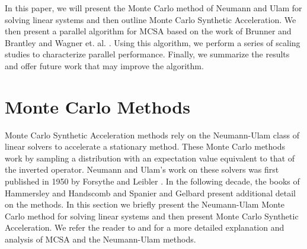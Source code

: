 \documentclass{snamc2013}
\begin{document}
In this paper, we will present the Monte Carlo method of Neumann and
Ulam for solving linear systems and then outline Monte Carlo Synthetic
Acceleration. We then present a parallel algorithm for MCSA based on
the work of Brunner and Brantley \cite{brunner_efficient_2009} and
Wagner et. al. \cite{wagner_hybrid_2010}. Using this algorithm, we
perform a series of scaling studies to characterize parallel
performance. Finally, we summarize the results and offer future work
that may improve the algorithm.

\section{Monte Carlo Methods}
Monte Carlo Synthetic Acceleration methods rely on the Neumann-Ulam
class of linear solvers to accelerate a stationary method. These Monte
Carlo methods work by sampling a distribution with an expectation
value equivalent to that of the inverted operator. Neumann and Ulam's
work on these solvers was first published in 1950 by Forsythe and
Leibler \cite{forsythe_matrix_1950}. In the following decade, the
books of Hammersley and Handscomb \cite{hammersley_monte_1964} and
Spanier and Gelbard \cite{spanier_monte_1969} present additional
detail on the methods. In this section we briefly present the
Neumann-Ulam Monte Carlo method for solving linear systems and then
present Monte Carlo Synthetic Acceleration. We refer the reader to
\cite{evans_monte_2009} and \cite{evans_monte_2012} for a more
detailed explanation and analysis of MCSA and the Neumann-Ulam
methods.
\end{document}
